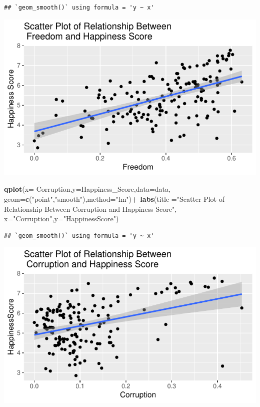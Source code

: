 \documentclass[
  11pt,
]{article}
\newenvironment{Shaded}{\begin{snugshade}}{\end{snugshade}}
\newcommand{\AttributeTok}[1]{\textcolor[rgb]{0.13,0.29,0.53}{#1}}
\newcommand{\FunctionTok}[1]{\textcolor[rgb]{0.13,0.29,0.53}{\textbf{#1}}}
\newcommand{\NormalTok}[1]{#1}
\newcommand{\SpecialCharTok}[1]{\textcolor[rgb]{0.81,0.36,0.00}{\textbf{#1}}}
\newcommand{\StringTok}[1]{\textcolor[rgb]{0.31,0.60,0.02}{#1}}
\begin{document}
\begin{verbatim}
## `geom_smooth()` using formula = 'y ~ x'
\end{verbatim}

\begin{center}\includegraphics[width=0.7\linewidth]{Group_project_2_files/figure-latex/unnamed-chunk-7-1} \end{center}

\begin{Shaded}
\begin{Highlighting}[]
 \FunctionTok{qplot}\NormalTok{(}\AttributeTok{x=}\NormalTok{ Corruption,}\AttributeTok{y=}\NormalTok{Happiness\_Score,}\AttributeTok{data=}\NormalTok{data,}
 \AttributeTok{geom=}\FunctionTok{c}\NormalTok{(}\StringTok{"point"}\NormalTok{,}\StringTok{"smooth"}\NormalTok{),}\AttributeTok{method=}\StringTok{"lm"}\NormalTok{)}\SpecialCharTok{+}
 \FunctionTok{labs}\NormalTok{(}\AttributeTok{title =}\StringTok{"Scatter Plot of Relationship Between}
\StringTok{ Corruption and Happiness Score"}\NormalTok{,}
 \AttributeTok{x=}\StringTok{"Corruption"}\NormalTok{,}\AttributeTok{y=}\StringTok{"HappinessScore"}\NormalTok{)}
\end{Highlighting}
\end{Shaded}

\begin{verbatim}
## `geom_smooth()` using formula = 'y ~ x'
\end{verbatim}

\begin{center}\includegraphics[width=0.7\linewidth]{Group_project_2_files/figure-latex/unnamed-chunk-8-1} \end{center}
\end{document}
